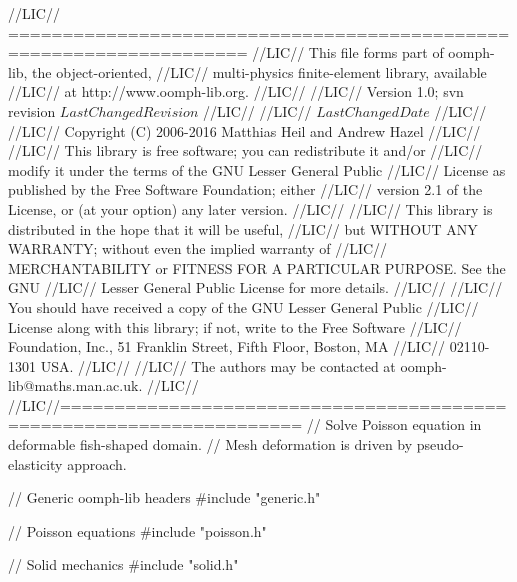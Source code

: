 \begin{DoxyCodeInclude}
\textcolor{comment}{//LIC// ====================================================================}
\textcolor{comment}{//LIC// This file forms part of oomph-lib, the object-oriented, }
\textcolor{comment}{//LIC// multi-physics finite-element library, available }
\textcolor{comment}{//LIC// at http://www.oomph-lib.org.}
\textcolor{comment}{//LIC// }
\textcolor{comment}{//LIC//    Version 1.0; svn revision $LastChangedRevision$}
\textcolor{comment}{//LIC//}
\textcolor{comment}{//LIC// $LastChangedDate$}
\textcolor{comment}{//LIC// }
\textcolor{comment}{//LIC// Copyright (C) 2006-2016 Matthias Heil and Andrew Hazel}
\textcolor{comment}{//LIC// }
\textcolor{comment}{//LIC// This library is free software; you can redistribute it and/or}
\textcolor{comment}{//LIC// modify it under the terms of the GNU Lesser General Public}
\textcolor{comment}{//LIC// License as published by the Free Software Foundation; either}
\textcolor{comment}{//LIC// version 2.1 of the License, or (at your option) any later version.}
\textcolor{comment}{//LIC// }
\textcolor{comment}{//LIC// This library is distributed in the hope that it will be useful,}
\textcolor{comment}{//LIC// but WITHOUT ANY WARRANTY; without even the implied warranty of}
\textcolor{comment}{//LIC// MERCHANTABILITY or FITNESS FOR A PARTICULAR PURPOSE.  See the GNU}
\textcolor{comment}{//LIC// Lesser General Public License for more details.}
\textcolor{comment}{//LIC// }
\textcolor{comment}{//LIC// You should have received a copy of the GNU Lesser General Public}
\textcolor{comment}{//LIC// License along with this library; if not, write to the Free Software}
\textcolor{comment}{//LIC// Foundation, Inc., 51 Franklin Street, Fifth Floor, Boston, MA}
\textcolor{comment}{//LIC// 02110-1301  USA.}
\textcolor{comment}{//LIC// }
\textcolor{comment}{//LIC// The authors may be contacted at oomph-lib@maths.man.ac.uk.}
\textcolor{comment}{//LIC// }
\textcolor{comment}{//LIC//====================================================================}
\textcolor{comment}{// Solve Poisson equation in deformable fish-shaped domain.}
\textcolor{comment}{// Mesh deformation is driven by pseudo-elasticity approach.}

\textcolor{comment}{// Generic oomph-lib headers}
\textcolor{preprocessor}{#include "generic.h"}  

\textcolor{comment}{// Poisson equations}
\textcolor{preprocessor}{#include "poisson.h"}

\textcolor{comment}{// Solid mechanics}
\textcolor{preprocessor}{#include "solid.h"}
 

\end{DoxyCodeInclude}
